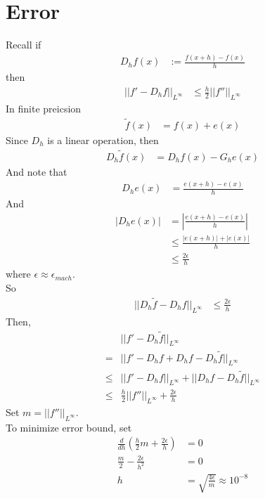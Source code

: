 \documentclass[11pt,oneside]{book}
\theoremstyle{break}
\theoremstyle{break}
\begin{document}
\section[Error]{Error}
Recall if \begin{align*}
D_hf(x)&:=\frac{f(x+h)-f(x)}{h}
\end{align*}
then \begin{align*}
||f'-D_hf||_{L^\infty}&\leq \frac{h}{2}||f''||_{L^{\infty}}
\end{align*}
In finite preicsion \begin{align*}
\widetilde{f}(x)&=f(x)+e(x)
\end{align*}
Since $D_h$ is a linear operation, then \begin{align*}
D_h\widetilde{f}(x)&=D_hf(x)-G_he(x)
\end{align*}
And note that \begin{align*}
D_he(x)&=\frac{e(x+h)-e(x)}{h}
\end{align*}
And \begin{align*}
|D_he(x)|&=\left|\frac{e(x+h)-e(x)}{h} \right|\\
&\leq \frac{|e(x+h)|+|e(x)|}{h}\\
&\leq \frac{2\epsilon}{h}
\end{align*}
where $\epsilon \approx \epsilon_{mach}$.\\
So \begin{align*}
||D_h\widetilde{f}-D_hf||_{L^{\infty}}&\leq \frac{2\epsilon}{h}
\end{align*}
Then, \begin{align*}
&||f'-D_h\widetilde{f}||_{L^{\infty}}\\
=&||f'-D_hf+D_hf-D_h\widetilde{f}||_{L^{\infty}}\\
\leq &||f'-D_hf||_{L^{\infty}}+||D_hf-D_h\widetilde{f}||_{L^{\infty}}\\
\leq & \frac{h}{2}||f''||_{L^{\infty}}+\frac{2\epsilon}{h}
\end{align*}
Set $m=||f''||_{L^{\infty}}$.\\
To minimize error bound, set \begin{align*}
\frac{d}{dh}\left(\frac{h}{2}m+\frac{2\epsilon}{h} \right)&=0\\
\frac{m}{2}-\frac{2\epsilon}{h^2}&=0\\
h&=\sqrt{\frac{4\epsilon}{m}}\approx 10^{-8}
\end{align*}
\end{document}
